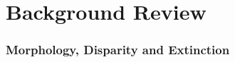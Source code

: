 \documentclass[titlepage]{article}
\begin{document}
\part{Background Review}





\section{Morphology, Disparity and Extinction}
\end{document}
